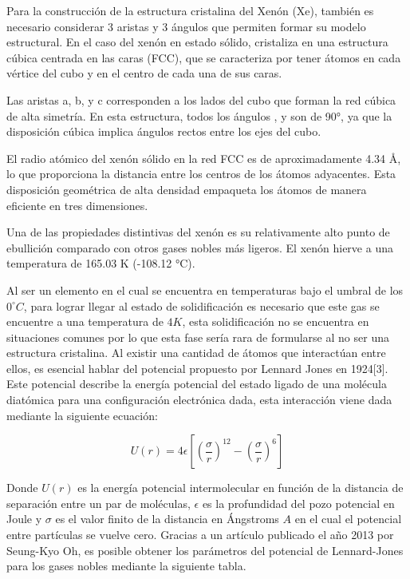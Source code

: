 \documentclass[10pt,letterpaper,twocolumn]{article}
\begin{document}
Para la construcción de la estructura cristalina del Xenón (Xe), también es necesario considerar 3 aristas y 3 ángulos que permiten formar su modelo estructural. En el caso del xenón en estado sólido, cristaliza en una estructura cúbica centrada en las caras (FCC), que se caracteriza por tener átomos en cada vértice del cubo y en el centro de cada una de sus caras.

Las aristas a, b, y c corresponden a los lados del cubo que forman la red cúbica de alta simetría. En esta estructura, todos los ángulos \si{\alpha}, \si{\beta} y \si{\gamma} son de 90°, ya que la disposición cúbica implica ángulos rectos entre los ejes del cubo.

El radio atómico del xenón sólido en la red FCC es de aproximadamente 4.34 Å, lo que proporciona la distancia entre los centros de los átomos adyacentes. Esta disposición geométrica de alta densidad empaqueta los átomos de manera eficiente en tres dimensiones.

Una de las propiedades distintivas del xenón es su relativamente alto punto de ebullición comparado con otros gases nobles más ligeros. El xenón hierve a una temperatura de 165.03 K (-108.12 °C).

Al ser un elemento en el cual se encuentra en temperaturas bajo el umbral de los $0^{\circ}C$, para lograr llegar al estado de solidificación es necesario que este gas se encuentre a una temperatura de $4K$, esta solidificación no se encuentra en situaciones comunes por lo
que esta fase sería rara de formularse al no ser una estructura cristalina.
Al existir una cantidad de átomos que interactúan entre ellos, es esencial hablar del potencial propuesto por Lennard Jones en 1924[3]. Este potencial describe la energía potencial del estado ligado de una molécula diatómica para una configuración electrónica dada, esta interacción viene dada mediante la siguiente ecuación:

\begin{equation}
    U(r)=4\epsilon\left[\left(\dfrac{\sigma}{r}\right)^{12} - \left(\dfrac{\sigma}{r}\right)^{6}\right]
\end{equation} 

Donde $U(r)$ es la energía potencial intermolecular en función de la distancia de separación entre un par de moléculas, $\epsilon$ es la profundidad del pozo potencial en Joule y $\sigma$ es el valor finito de la distancia en Ángstroms $A$ en el cual el potencial entre partículas se vuelve cero.
Gracias a un artículo publicado el año 2013 por Seung-Kyo Oh, es posible
obtener los parámetros del potencial de Lennard-Jones para los gases nobles
mediante la siguiente tabla.
\end{document}
